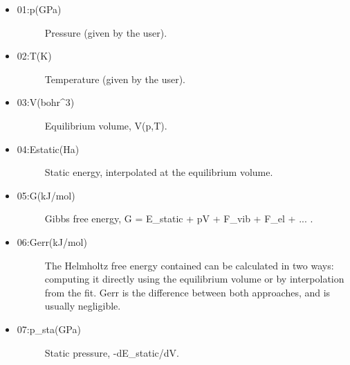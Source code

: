 \documentclass[a4paper]{article}
\begin{document}
\begin{itemize}
\item 
\begin{description}
\item[{01:p(GPa)}] \leavevmode 
Pressure (given by the user).

\end{description}

\item 
\begin{description}
\item[{02:T(K)}] \leavevmode 
Temperature (given by the user).

\end{description}

\item 
\begin{description}
\item[{03:V(bohr\textasciicircum{}3)}] \leavevmode 
Equilibrium volume, V(p,T).

\end{description}

\item 
\begin{description}
\item[{04:Estatic(Ha)}] \leavevmode 
Static energy, interpolated at the equilibrium volume.

\end{description}

\item 
\begin{description}
\item[{05:G(kJ/mol)}] \leavevmode 
Gibbs free energy, G = E\_static + pV + F\_vib + F\_el + ... .

\end{description}

\item 
\begin{description}
\item[{06:Gerr(kJ/mol)}] \leavevmode 
The Helmholtz free energy contained can be calculated in two ways:
computing it directly using the equilibrium volume or by
interpolation from the fit. Gerr is the difference between both
approaches, and is usually negligible.

\end{description}

\item 
\begin{description}
\item[{07:p\_sta(GPa)}] \leavevmode 
Static pressure, -dE\_static/dV.


\end{description}
\end{itemize}
\end{document}
